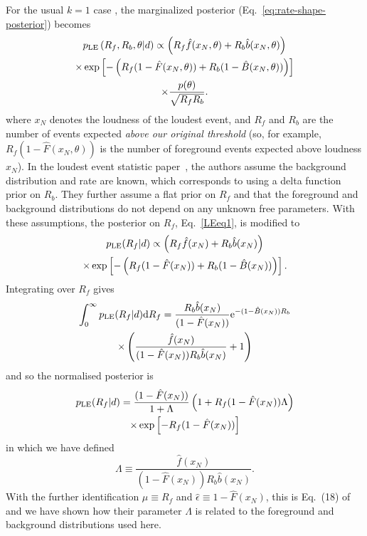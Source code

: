 \documentclass[aps,prd,reprint,nofootinbib]{revtex4-1}
\begin{document}
For the usual $k=1$ case \citep{Biswas2009}, the marginalized
posterior (Eq.~\eqref{eq:rate-shape-posterior}) becomes
\begin{multline}\label{LEeq1}
p_{\rm LE}\left( R_f, R_b, \theta | d \right) \propto \left(R_f
\hat{f}(x_N,\theta) + R_b \hat{b}(x_N,\theta)\right) \\ \times \exp\left[-\left(
  R_f (1-\hat{F}(x_N,\theta)) + R_b (1-\hat{B}(x_N,\theta)) \right)
  \right] \\ \times \frac{p(\theta)}{\sqrt{R_f R_b}}.
\end{multline}
where $x_N$ denotes the loudness of the loudest event, and $R_f$ and
$R_b$ are the number of events expected \emph{above our original
  threshold} (so, for example, $R_f (1 - \hat{F}(x_N,\theta))$ is the
number of foreground events expected above loudness $x_N$).  In the
loudest event statistic paper~\citep{Biswas2009}, the authors assume
the background distribution and rate are known, which corresponds to
using a delta function prior on $R_b$. They further assume a flat
prior on $R_f$ and that the foreground and background distributions do
not depend on any unknown free parameters. With these assumptions, the
posterior on $R_f$, Eq.~\eqref{LEeq1}, is modified to
\begin{multline}
p_{\rm LE}(R_f|d) \propto  \left(R_f
\hat{f}(x_N) + R_b \hat{b}(x_N)\right) \\ \times \exp\left[-\left(
  R_f (1-\hat{F}(x_N)) + R_b (1-\hat{B}(x_N)) \right)
  \right] .
\end{multline}
Integrating over $R_f$ gives
\begin{multline}
\int_0^\infty p_{\rm LE}(R_f|d) {\rm d}R_f =  \frac{R_b \hat{b}(x_N)}{(1-\hat{F}(x_N))} {\rm e}^{-(1-\hat{B}(x_N)) R_b}\\
\times \left(\frac{\hat{f}(x_N)}{(1-\hat{F}(x_N)) R_b \hat{b}(x_N)} + 1 \right)
\end{multline}
and so the normalised posterior is
\begin{multline}
p_{\rm LE}(R_f|d) = \frac{(1-\hat{F}(x_N))}{1+\Lambda} \left( 1+ R_f (1-\hat{F}(x_N))\Lambda \right) \\
\times \exp\left[-R_f (1-\hat{F}(x_N))\right]
\label{loudest-eq}
\end{multline}
in which we have defined
\begin{equation}
\Lambda \equiv \frac{\hat{f}(x_N)}{(1-\hat{F}(x_N)) R_b \hat{b}(x_N)}.
\end{equation}
With the further identification $\mu \equiv R_f$ and $\hat{\epsilon} \equiv 1 - \hat{F}(x_N)$, this is Eq.~(18) of~\citep{Biswas2009} and we have shown how their parameter $\Lambda$ is related to the foreground and background distributions used here.
\end{document}
